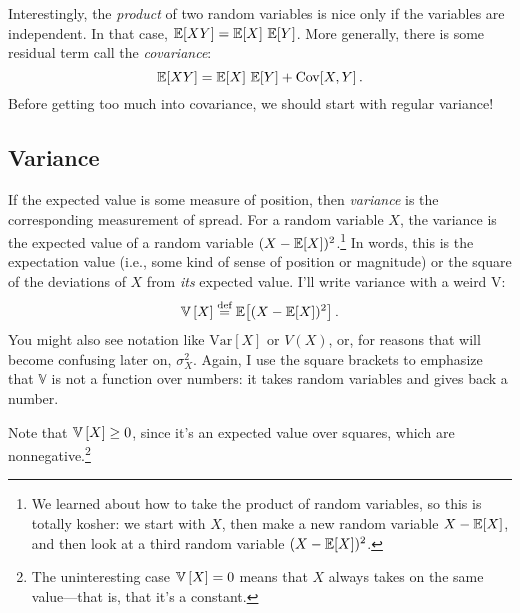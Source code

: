 Interestingly, the \emph{product} of two random variables is nice only if the
variables are independent. In that case, $\mathbb{E}\!\left[{XY}\right] = \mathbb{E}\!\left[{X}\right]\,\mathbb{E}\!\left[{Y}\right]$.
More generally, there is some residual term call the \emph{covariance}:
\begin{equation}
\mathbb{E}\!\left[{XY}\right] = \mathbb{E}\!\left[{X}\right] \, \mathbb{E}\!\left[{Y}\right] + \mathrm{Cov}\!\left[{X, Y}\right].
\end{equation}
Before getting too much into covariance, we should start with regular variance!

\subsection{Variance}

If the expected value is some measure of position, then \emph{variance} is the
corresponding measurement of spread. For a random variable $X$, the variance
is the expected value of a random variable $(X - \mathbb{E}\!\left[{X}\right])^2$.\footnote{We
learned about how to take the product of random variables, so this is totally
kosher: we start with $X$, then make a new random variable $X - \mathbb{E}\!\left[{X}\right]$,
and then look at a third random variable $(X - \mathbb{E}\!\left[{X}\right])^2$.} In words, this
is the expectation value (i.e., some kind of sense of position or magnitude)
or the square of the deviations of $X$ from \emph{its} expected value. I'll
write variance with a weird V:
\begin{equation}
\mathbb{V}\left[{X}\right] \stackrel{\text{def}}{=} \mathbb{E}\!\left[{(X - \mathbb{E}\!\left[{X}\right])^2}\right].
\end{equation}
You might also see notation like $\mathrm{Var}[X]$ or $V(X)$, or, for reasons
that will become confusing later on, $\sigma^2_X$. Again, I use the square brackets
to emphasize that $\mathbb{V}$ is not a function over numbers: it takes random
variables and gives back a number.

Note that $\mathbb{V}\left[{X}\right] \geq 0$, since it's an expected value over squares, which
are nonnegative.\footnote{The uninteresting case $\mathbb{V}\left[{X}\right] = 0$ means that $X$
always takes on the same value---that is, that it's a constant.}


